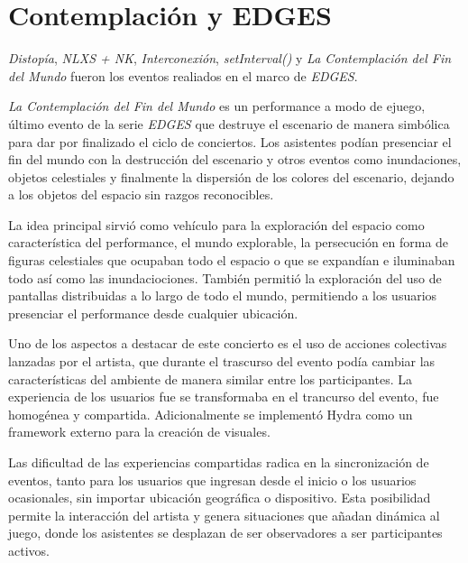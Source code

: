 
\section*{Contemplación y EDGES} %

\iffalse
\begin{itemize}
\item Distopía
\item domo 
\item Underborders
\item Milena y Concepción
\item setInterval()
\item Contemplación del fin del Mundo
\item sistemas mixtos
\item espacio y performance fusionados en Contemplación
\end{itemize}
\fi

\textit{Distopía}, \textit{NLXS + NK}, \textit{Interconexión}, \textit{setInterval()} y \textit{La Contemplación del Fin del Mundo} fueron los eventos realiados en el marco de \textit{EDGES}. 

\textit{La Contemplación del Fin del Mundo} es un performance a modo de ejuego, último evento de la serie \textit{EDGES} que destruye el escenario de manera simbólica para dar por finalizado el ciclo de conciertos. Los asistentes podían presenciar el fin del mundo con la destrucción del escenario y otros eventos como inundaciones, objetos celestiales y finalmente la dispersión de los colores del escenario, dejando a los objetos del espacio sin razgos reconocibles.

La idea principal sirvió como vehículo para la exploración del espacio como característica del performance, el mundo explorable, la persecución en forma de figuras celestiales que ocupaban todo el espacio o que se expandían e iluminaban todo así como las inundaciociones. También permitió la exploración del uso de pantallas distribuidas a lo largo de todo el mundo, permitiendo a los usuarios presenciar el performance desde cualquier ubicación.

Uno de los aspectos a destacar de este concierto es el uso de acciones colectivas lanzadas por el artista, que durante el trascurso del evento podía cambiar las características del ambiente de manera similar entre los participantes. La experiencia de los usuarios fue se transformaba en el trancurso del evento, fue homogénea y compartida. Adicionalmente se implementó Hydra \citep{hydra} como un framework externo para la creación de visuales.

Las dificultad de las experiencias compartidas radica en la sincronización de eventos, tanto para los usuarios que ingresan desde el inicio o los usuarios ocasionales, sin importar ubicación geográfica o dispositivo. Esta posibilidad permite la interacción del artista y genera situaciones que añadan dinámica al juego, donde los asistentes se desplazan de ser observadores a ser participantes activos.

